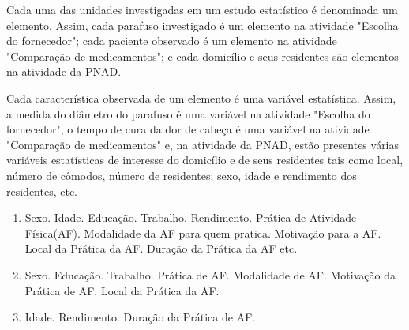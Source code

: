 \documentclass[10 pt,usenames,dvipsnames, oneside]{article}
\begin{document}
Cada uma das unidades investigadas em um estudo estatístico é denominada um elemento.  Assim, cada parafuso investigado é um elemento na atividade "Escolha do fornecedor"; cada paciente observado é um elemento na atividade "Comparação de medicamentos"; e cada domicílio e seus residentes são elementos na atividade da PNAD.

Cada característica observada de um elemento é uma variável estatística. Assim, a medida do diâmetro do parafuso é uma variável na atividade "Escolha do fornecedor", o tempo de cura da dor de cabeça é uma variável na atividade "Comparação de medicamentos" e, na atividade da PNAD, estão presentes várias variáveis estatísticas de interesse do domicílio e de seus residentes tais como local, número de cômodos, número de residentes; sexo, idade e rendimento dos residentes, etc.


\ifdefined\prof
\clearpage
\begin{solucao}
\begin{enumerate}
\item Sexo. Idade. Educação. Trabalho. Rendimento. Prática de Atividade Física(AF). Modalidade da AF para quem pratica. Motivação para a AF. Local da Prática da AF. Duração da Prática da AF etc.

\item Sexo. Educação. Trabalho. Prática de AF. Modalidade de AF. Motivação da Prática de AF. Local da Prática da AF.

\item Idade. Rendimento. Duração da Prática de AF.
\end{enumerate}
\end{solucao}
\fi
\end{document}
